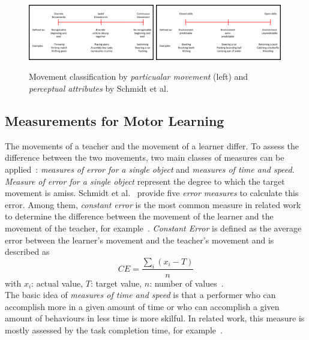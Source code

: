 \begin{figure}[htb]
	\centering
	\includegraphics[width=0.49\textwidth]{figures/movement_classification.png}
	\includegraphics[width=0.49\textwidth]{figures/movement_classification2.png}
	\caption[Movement classifications by Scmhidt et al.]{Movement classification by \textit{particualar movement} (left) and \textit{perceptual attributes} by Schmidt et al.~\cite{mlbook}}
	\label{fig:movement_classification}
\end{figure}

\subsection{Measurements for Motor Learning}
\label{section:measures_for_ml}
The movements of a teacher and the movement of a learner differ. To assess the difference between the two movements, two main classes of measures can be applied~\cite{mlbook}: \textit{measures of error for a single object} and \textit{measures of time and speed}.
\textit{Measure of error for a single object} represent the degree to which the target movement is amiss. Schmidt et al.~\cite{mlbook} provide five \textit{error measures} to calculate this error. Among them, \textit{constant error} is the most common measure in related work to determine the difference between the movement of the learner and the movement of the teacher, for example~\cite{perspectivematters,thaichichua,YouMove,onebody,vrdancetrainer,lightguide,physioathome}. \textit{Constant Error} is defined as the average error between the learner's movement and the teacher's movement and is described as
\begin{equation}
	\label{eq:constanterror}
	CE=\frac{\sum_i(x_i-T)}{n}
\end{equation}
with $x_i$: actual value, $T$: target value, $n$: number of values~\cite{mlbook}.\\
The basic idea of \textit{measures of time and speed} is that a performer who can accomplish more in a given amount of time or who can accomplish a given amount of behaviours in less time is more skilful. In related work, this measure is mostly assessed by the task completion time, for example~\cite{perspectivematters,onebody,lightguide}.


